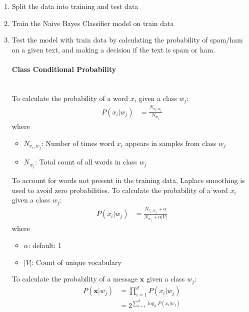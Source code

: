 \begin{enumerate}
    \item Split the data into training and test data
    \item Train the Naive Bayes Classifier model on train data
    \item Test the model with train data by calculating the probability of spam/ham on a given text, and making a decision if the text is spam or ham.
    
    \paragraph{Class Conditional Probability}\mbox{}\\
    To calculate the probability of a word $x_i$ given a class $w_j$:
    \begin{align}
        P(x_i | w_j) &= \frac{N_{x_i, w_j}}{N_{w_j}}
    \end{align}
    where
    \begin{itemize}
        \item $N_{x_i, w_j}$: Number of times word $x_i$ appears in samples from class $w_j$
        \item $N_{w_j}$: Total count of all words in class $w_j$
    \end{itemize}

    To account for words not present in the training data, Laplace smoothing is used to avoid zero probabilities.
    To calculate the probability of a word $x_i$ given a class $w_j$:
    \begin{align}
        P(x_i | w_j) &= \frac{N_{x_i, w_j} + \alpha}{N_{w_j} + \alpha |V|}
    \end{align}
    where
    \begin{itemize}
        \item $\alpha$: default: 1
        \item $|V|$: Count of unique vocabulary
    \end{itemize}



    To calculate the probability of a message $\mathbf{x}$ given a class $w_j$:
    \begin{align}
        P(\mathbf{x} | w_j) &= \prod_{i=1}^{d} P(x_i | w_j)\\
        &= 2^{\sum_{i=1}^{d} \log_2 P(x_i | w_j)}
    \end{align}





\end{enumerate}
